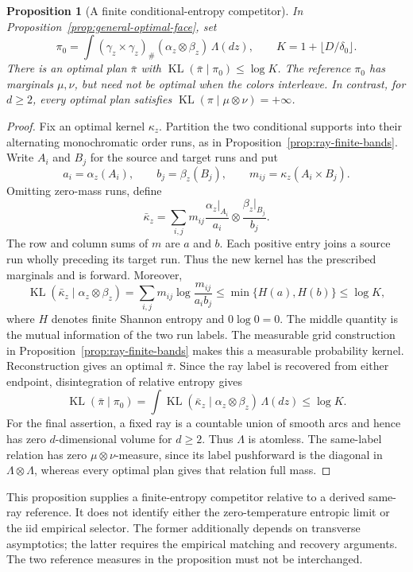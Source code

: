 \documentclass[11pt,reqno]{amsart}
\newtheorem{proposition}[theorem]{Proposition}
\theoremstyle{definition}
\theoremstyle{remark}
\numberwithin{equation}{section}
\begin{document}
\begin{proposition}[A finite conditional-entropy competitor]
\label{prop:ray-finite-entropy}
In Proposition~\ref{prop:general-optimal-face}, set
\[
\pi_0=\int(\gamma_z\times\gamma_z)_\#
             (\alpha_z\otimes\beta_z)\,\Lambda(dz),
\qquad K=1+\lfloor D/\delta_0\rfloor.
\]
There is an optimal plan \(\bar\pi\) with
\(\operatorname{KL}(\bar\pi\mid\pi_0)\le\log K\).
The reference \(\pi_0\) has marginals \(\mu,\nu\), but need not be
optimal when the colors interleave. In contrast, for \(d\ge2\),
every optimal plan satisfies
\(\operatorname{KL}(\pi\mid\mu\otimes\nu)=+\infty\).
\end{proposition}

\begin{proof}
Fix an optimal kernel \(\kappa_z\). Partition the two conditional
supports into their alternating monochromatic order runs, as in
Proposition~\ref{prop:ray-finite-bands}. Write \(A_i\) and \(B_j\)
for the source and target runs and put
\[
a_i=\alpha_z(A_i),\qquad b_j=\beta_z(B_j),\qquad
m_{ij}=\kappa_z(A_i\times B_j).
\]
Omitting zero-mass runs, define
\[
\bar\kappa_z=
\sum_{i,j}m_{ij}
  \frac{\alpha_z|_{A_i}}{a_i}\otimes
  \frac{\beta_z|_{B_j}}{b_j}.
\]
The row and column sums of \(m\) are \(a\) and \(b\).
Each positive entry joins a source run wholly preceding its target
run. Thus the new kernel has the prescribed marginals and is forward.
Moreover,
\[
\operatorname{KL}(\bar\kappa_z\mid\alpha_z\otimes\beta_z)
=\sum_{i,j}m_{ij}\log\frac{m_{ij}}{a_i b_j}
\le \min\{H(a),H(b)\}\le\log K,
\]
where \(H\) denotes finite Shannon entropy and \(0\log0=0\).
The middle quantity is the mutual information of the two run labels.
The measurable grid construction in
Proposition~\ref{prop:ray-finite-bands} makes this a measurable
probability kernel. Reconstruction gives an optimal \(\bar\pi\).
Since the ray label is recovered from either endpoint, disintegration
of relative entropy gives
\[
\operatorname{KL}(\bar\pi\mid\pi_0)
=\int\operatorname{KL}(\bar\kappa_z\mid
                 \alpha_z\otimes\beta_z)\,\Lambda(dz)
\le\log K.
\]
For the final assertion, a fixed ray is a countable union of smooth
arcs and hence has zero \(d\)-dimensional volume for \(d\ge2\).
Thus \(\Lambda\) is atomless. The same-label relation has zero
\(\mu\otimes\nu\)-measure, since its label pushforward is the
diagonal in \(\Lambda\otimes\Lambda\), whereas every optimal plan
gives that relation full mass.
\end{proof}

This proposition supplies a finite-entropy competitor relative to a
derived same-ray reference. It does not identify either the
zero-temperature entropic limit or the iid empirical selector.
The former additionally depends on transverse asymptotics; the latter
requires the empirical matching and recovery arguments. The two
reference measures in the proposition must not be interchanged.
\end{document}
